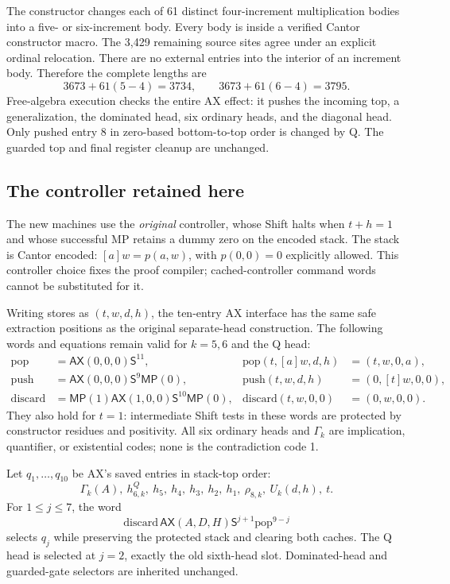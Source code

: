 \documentclass[11pt,letterpaper]{article}
\newcommand{\AX}{\mathsf{AX}}
\newcommand{\MP}{\mathsf{MP}}
\newcommand{\Shift}{\mathsf S}
\begin{document}
The constructor changes each of 61 distinct four-increment multiplication
bodies into a five- or six-increment body. Every body is inside a verified
Cantor constructor macro. The 3,429 remaining source sites agree under an
explicit ordinal relocation. There are no external entries into the
interior of an increment body. Therefore the complete lengths are
\[
 3673+61(5-4)=3734,\qquad
 3673+61(6-4)=3795.
\]
Free-algebra execution checks the entire AX effect: it pushes the incoming
top, a generalization, the dominated head, six ordinary heads, and the
diagonal head. Only pushed entry 8 in zero-based bottom-to-top order is
changed by Q. The guarded top and final register cleanup are unchanged.

\subsection{The controller retained here}

The new machines use the \emph{original} controller, whose Shift halts
when $t+h=1$ and whose successful MP retains a dummy zero on the encoded
stack. The stack is Cantor encoded: $[a]w=p(a,w)$, with
$p(0,0)=0$ explicitly allowed. This controller choice fixes the proof
compiler; cached-controller command words cannot be substituted for it.

Writing stores as $(t,w,d,h)$, the ten-entry AX interface has the same
safe extraction positions as the original separate-head construction.
The following words and equations remain valid for $k=5,6$ and the Q head:
\begin{align*}
\mathrm{pop}&=\AX(0,0,0)\Shift^{11},&
\mathrm{pop}(t,[a]w,d,h)&=(t,w,0,a),\\
\mathrm{push}&=\AX(0,0,0)\Shift^9\MP(0),&
\mathrm{push}(t,w,d,h)&=(0,[t]w,0,0),\\
\mathrm{discard}&=\MP(1)\AX(1,0,0)\Shift^{10}\MP(0),&
\mathrm{discard}(t,w,0,0)&=(0,w,0,0).
\end{align*}
They also hold for $t=1$: intermediate Shift tests in these words are
protected by constructor residues and positivity. All six ordinary
heads and $\Gamma_k$ are implication, quantifier, or existential codes;
none is the contradiction code 1.

Let $q_1,\ldots,q_{10}$ be AX's saved entries in stack-top order:
\[
\Gamma_k(A),\ h_{6,k}^Q,\ h_5,\ h_4,\ h_3,\ h_2,\ h_1,
\ \rho_{8,k},\ U_k(d,h),\ t.
\]
For $1\leq j\leq7$, the word
\[
\mathrm{discard}\,\AX(A,D,H)\Shift^{j+1}\mathrm{pop}^{9-j}
\]
selects $q_j$ while preserving the protected stack and clearing both
caches. The Q head is selected at $j=2$, exactly the old sixth-head slot.
Dominated-head and guarded-gate selectors are inherited unchanged.
\end{document}
